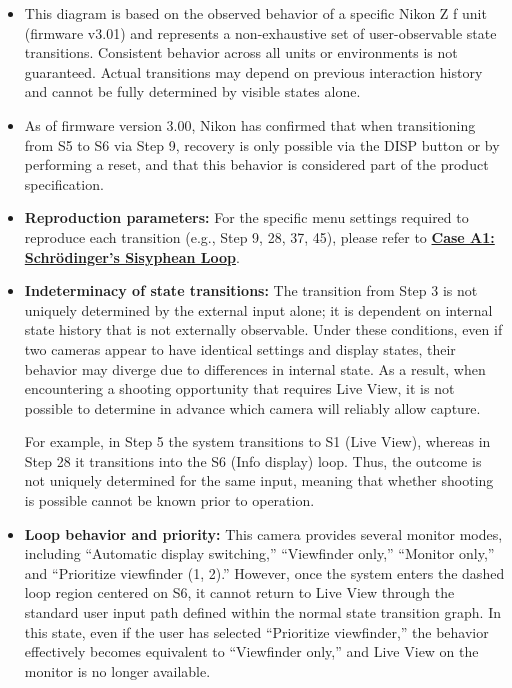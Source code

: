 \documentclass[a4paper,10pt]{article}
\begin{document}
\begin{itemize}
    \item This diagram is based on the observed behavior of a specific Nikon Z f
    unit (firmware v3.01) and represents a non-exhaustive set of
    user-observable state transitions. Consistent behavior across all units or
    environments is not guaranteed. Actual transitions may depend on previous
    interaction history and cannot be fully determined by visible states alone.

    \item As of firmware version 3.00, Nikon has confirmed that when
    transitioning from S5 to S6 via Step 9, recovery is only possible via the
    DISP button or by performing a reset, and that this behavior is considered
    part of the product specification.

    \item \textbf{Reproduction parameters:}
    For the specific menu settings required to reproduce each transition
    (e.g., Step 9, 28, 37, 45), please refer to
    \href{https://github.com/acta-lgtm/nikon-z-display5-persistence-case-zf/blob/main/docs/DA/Case_A1_Schrodinger.md}
    {\textbf{Case A1: Schrödinger's Sisyphean Loop}}.

    \item \textbf{Indeterminacy of state transitions:}
    The transition from Step 3 is not uniquely determined by the external input
    alone; it is dependent on internal state history that is not externally
    observable. Under these conditions, even if two cameras appear to have
    identical settings and display states, their behavior may diverge due to
    differences in internal state. As a result, when encountering a shooting
    opportunity that requires Live View, it is not possible to determine in
    advance which camera will reliably allow capture.

    For example, in Step 5 the system transitions to S1 (Live View), whereas
    in Step 28 it transitions into the S6 (Info display) loop. Thus, the
    outcome is not uniquely determined for the same input, meaning that whether
    shooting is possible cannot be known prior to operation.

    \item \textbf{Loop behavior and priority:}
    This camera provides several monitor modes, including ``Automatic display
    switching,'' ``Viewfinder only,'' ``Monitor only,'' and ``Prioritize
    viewfinder (1, 2).'' However, once the system enters the dashed loop region
    centered on S6, it cannot return to Live View through the standard user
    input path defined within the normal state transition graph. In this state,
    even if the user has selected ``Prioritize viewfinder,'' the behavior
    effectively becomes equivalent to ``Viewfinder only,'' and Live View on the
    monitor is no longer available.


\end{itemize}
\end{document}
